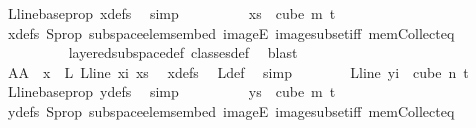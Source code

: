 \begin{isabellebody}
\ L{\isacharunderscore}{\kern0pt}line{\isacharunderscore}{\kern0pt}base{\isacharunderscore}{\kern0pt}prop\ xdefs\ \isamarkupfalse%
\ simp\isanewline
\ \ \ \ \ \ \isamarkupfalse%
\ \isamarkupfalse%
\ {\isachardoublequoteopen}xs\ {\isasymin}\ cube\ m\ {\isacharparenleft}{\kern0pt}t{\isacharplus}{\kern0pt}{}{\isacharparenright}{\kern0pt}{\isachardoublequoteclose}\ \isanewline
\ \ \ \ \ \ \ \ \isamarkupfalse%
\ xdefs\ S{\isacharunderscore}{\kern0pt}prop\ subspace{\isacharunderscore}{\kern0pt}elems{\isacharunderscore}{\kern0pt}embed\ imageE\ image{\isacharunderscore}{\kern0pt}subset{\isacharunderscore}{\kern0pt}iff\ mem{\isacharunderscore}{\kern0pt}Collect{\isacharunderscore}{\kern0pt}eq\ \isanewline
\ \ \ \ \ \ \ \ \isamarkupfalse%
\ layered{\isacharunderscore}{\kern0pt}subspace{\isacharunderscore}{\kern0pt}def\ classes{\isacharunderscore}{\kern0pt}def\ \isamarkupfalse%
\ blast\isanewline
\ \ \ \ \ \ \isamarkupfalse%
\ \isamarkupfalse%
\ AA{}{\isacharcolon}{\kern0pt}\ {\isachardoublequoteopen}{\isasymchi}\ x\ {\isacharequal}{\kern0pt}\ {\isasymchi}L\ {\isacharparenleft}{\kern0pt}L{\isacharunderscore}{\kern0pt}line\ xi{\isacharparenright}{\kern0pt}\ xs{\isachardoublequoteclose}\ \isamarkupfalse%
\ xdefs\ \isamarkupfalse%
\ {\isasymchi}L{\isacharunderscore}{\kern0pt}def\ \isamarkupfalse%
\ simp\isanewline
\isanewline
\ \ \ \ \ \ \isamarkupfalse%
\ {\isachardoublequoteopen}{\isacharparenleft}{\kern0pt}L{\isacharunderscore}{\kern0pt}line\ yi{\isacharparenright}{\kern0pt}\ {\isasymin}\ cube\ n\ {\isacharparenleft}{\kern0pt}t{\isacharplus}{\kern0pt}{}{\isacharparenright}{\kern0pt}{\isachardoublequoteclose}\ \isamarkupfalse%
\ L{\isacharunderscore}{\kern0pt}line{\isacharunderscore}{\kern0pt}base{\isacharunderscore}{\kern0pt}prop\ ydefs\ \isamarkupfalse%
\ simp\isanewline
\ \ \ \ \ \ \isamarkupfalse%
\ \isamarkupfalse%
\ {\isachardoublequoteopen}ys\ {\isasymin}\ cube\ m\ {\isacharparenleft}{\kern0pt}t{\isacharplus}{\kern0pt}{}{\isacharparenright}{\kern0pt}{\isachardoublequoteclose}\ \isanewline
\ \ \ \ \ \ \ \ \isamarkupfalse%
\ ydefs\ S{\isacharunderscore}{\kern0pt}prop\ subspace{\isacharunderscore}{\kern0pt}elems{\isacharunderscore}{\kern0pt}embed\ imageE\ image{\isacharunderscore}{\kern0pt}subset{\isacharunderscore}{\kern0pt}iff\ mem{\isacharunderscore}{\kern0pt}Collect{\isacharunderscore}{\kern0pt}eq\ \isanewline

\end{isabellebody}
